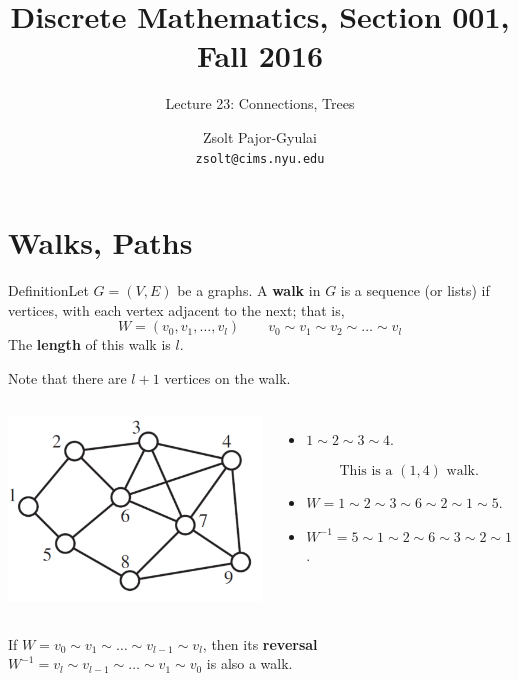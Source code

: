 \documentclass{beamer}
\title{Discrete Mathematics, Section 001, Fall 2016}
\subtitle{Lecture 23: Connections, Trees}
\author[Zsolt]{Zsolt Pajor-Gyulai \\ \texttt{zsolt@cims.nyu.edu}}
\institute[NYU] 
{
\normalsize Courant Institute of Mathematical Sciences
}
\def\bl[#1]#2{\begin{block}{#1}#2\end{block}}
\def\itemb{\begin{itemize}}
\def\iteme{\end{itemize}}
\begin{document}
\begin{frame}
  \titlepage
\end{frame}


\section{Walks, Paths}

\begin{frame}
\bl[Definition]{Let $G=(V,E)$ be a graphs. A \textbf{walk} in $G$ is a sequence (or lists) if vertices, with each vertex adjacent to the next; that is,
\[
W=(v_0,v_1,\dots,v_l)\qquad v_0\sim v_1\sim v_2\sim\dots\sim v_l
\]
The \textbf{length} of this walk is $l$. }
Note that there are $l+1$ vertices on the walk.
\begin{columns}
\includegraphics[scale=0.3]{WalkGraph.pdf}
\itemb
\item $1\sim 2\sim 3\sim 4$. \vspace{-0.1cm}
\bl[]{\vspace{-0.1cm}
\[
\textrm{This is a $(1,4)$ walk.}
\]}
\item $W=1\sim 2\sim 3\sim 6\sim 2\sim 1\sim 5$.
\item $W^{-1}=5\sim 1\sim 2\sim 6\sim 3\sim 2\sim 1$.
\iteme
\end{columns}\vspace{-0.2cm}
\bl[]{If $W=v_0\sim v_1\sim\dots\sim v_{l-1}\sim v_l$, then its \textbf{reversal} $W^{-1}=v_l\sim v_{l-1}\sim\dots\sim v_1\sim v_0$ is also a walk.}
\end{frame}
\end{document}
